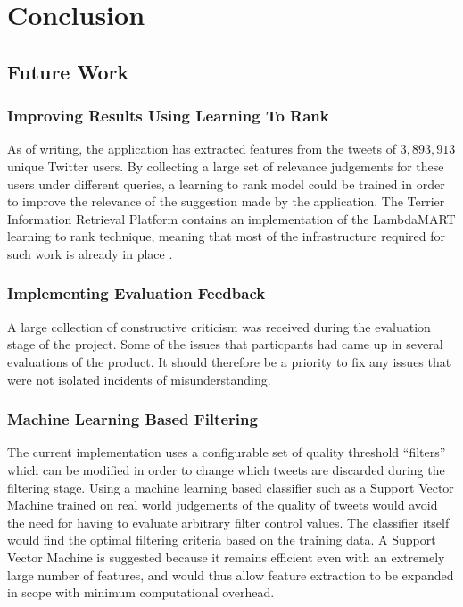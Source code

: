 \documentclass{l4proj}
\begin{document}
\chapter{Conclusion}
    
    \section{Future Work}
    
        \subsection{Improving Results Using Learning To Rank}
        As of writing, the application has extracted features from the tweets of $3,893,913$ unique Twitter users. By collecting a large set of relevance judgements for these users under different queries, a learning to rank model could be trained in order to improve the relevance of the suggestion made by the application. The Terrier Information Retrieval Platform contains an implementation of the LambdaMART learning to rank technique, meaning that most of the infrastructure required for such work is already in place \cite{l2r}.
        
        \subsection{Implementing Evaluation Feedback}
        A large collection of constructive criticism was received during the evaluation stage of the project. Some of the issues that particpants had came up in several evaluations of the product. It should therefore be a priority to fix any issues that were not isolated incidents of misunderstanding.
        
        \subsection{Machine Learning Based Filtering}
        The current implementation uses a configurable set of quality threshold ``filters'' which can be modified in order to change which tweets are discarded during the filtering stage. Using a machine learning based classifier such as a Support Vector Machine trained on real world judgements of the quality of tweets would avoid the need for having to evaluate arbitrary filter control values. The classifier itself would find the optimal filtering criteria based on the training data. A Support Vector Machine is suggested because it remains efficient even with an extremely large number of features, and would thus allow feature extraction to be expanded in scope with minimum computational overhead.
        
\end{document}
